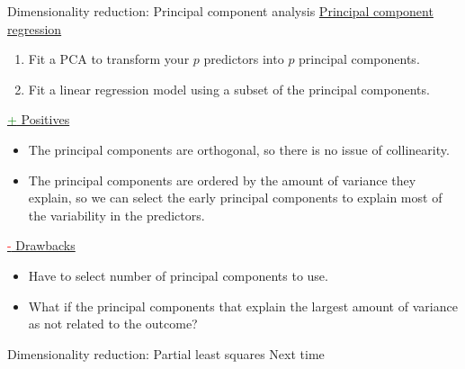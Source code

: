 \documentclass[8pt]{beamer}
\begin{document}
    \begin{frame}{Dimensionality reduction: Principal component analysis}
        \underline{Principal component regression}
        \begin{enumerate}
            \item Fit a PCA to transform your $p$ predictors into $p$ principal components.
            \item Fit a linear regression model using a subset of the principal components.
        \end{enumerate}
        \vspace{0.25cm}
        \underline{\textcolor{green}{+} Positives}\\
        \begin{itemize}
            \item The principal components are orthogonal, so there is no issue of collinearity.\\
            \item The principal components are ordered by the amount of variance they explain, so we can select the early principal components to explain most of the variability in the predictors.\\
        \end{itemize}
        \vspace{0.25cm}
        \underline{\textcolor{red}{-} Drawbacks}\\
        \begin{itemize}
            \item Have to select number of principal components to use.
            \item What if the principal components that explain the largest amount of variance as not related to the outcome?
        \end{itemize}
        \end{frame}

    \begin{frame}{Dimensionality reduction: Partial least squares}
        Next time
    \end{frame}
\end{document}
